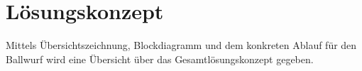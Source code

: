\section{Lösungskonzept} Mittels Übersichtszeichnung, Blockdiagramm und dem konkreten Ablauf für den Ballwurf wird eine Übersicht über das Gesamtlösungskonzept gegeben.


\newpage

\newpage

\newpage

\newpage
